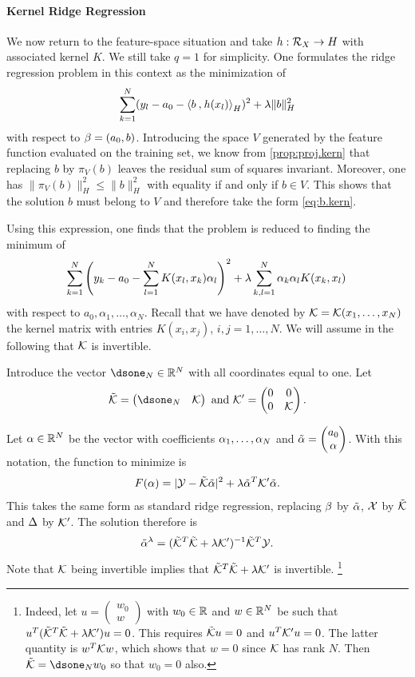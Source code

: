 \paragraph{Kernel Ridge Regression}
We now return to the feature-space situation and take $h: {\mathcal R}_X \to H$ with associated kernel $K$. We still take $q=1$ for simplicity. One formulates the ridge regression problem in this context as the minimization of
$$
\sum_{k=1}^N(y_l - {a_0} - {\langle {b}\mathbin{,} {h(x_l)}\rangle}_H)^2 + \lambda \|b\|_H^2
$$
with respect to $\beta = ({a_0}, b)$. Introducing the space $V$ generated by the feature function evaluated on the training set, we know from \cref{prop:proj.kern} that replacing $b$ by $\pi_V(b)$ leaves the residual sum of squares invariant. Moreover, one has $\|\pi_V(b)\|_H^2 \leq \|b\|_H^2$ with equality if and only if $b\in V$. This shows that the solution $b$ must belong to $V$ and therefore take the form \eqref{eq:b.kern}. 

Using this expression, one finds that the problem is  reduced to finding the minimum of 
$$
\sum_{k=1}^N\left(y_k - {a_0} - \sum_{l=1}^N K(x_l, x_k)\alpha_l \right)^2 +
\lambda \sum_{k,l=1}^N \alpha_k\alpha_l K(x_k, x_l)\,
$$
with respect to ${a_0}, \alpha_1, \ldots, \alpha_N$. 
Recall that we have denoted by ${\mathcal K} = {\mathcal K}(x_1, \ldots, x_N)$ the kernel matrix with entries $K(x_i,x_j)$, $i,j=1, \ldots, N$. We will assume in the following that ${\mathcal K}$ is invertible. 

Introduce the vector $\dsone_N\in \mR^N$  with all coordinates equal to one.  Let 
\[
\tilde \CK = \begin{pmatrix} \dsone_{N} &\CK\end{pmatrix} \text{ and } \CK' = \begin{pmatrix} 0 & 0 \\0 &\CK\end{pmatrix}.
\]

Let $\alpha\in {\mathbb{R}}^N$ be the vector with coefficients $\alpha_1, \ldots, \alpha_N$ and $\tilde {\alpha}  = \begin{pmatrix}{a_0}\\ \alpha \end{pmatrix}$. 
With this notation, the function to minimize is
\[
F(\alpha) = |{\mathcal Y} - \tilde{{\mathcal K}} \tilde{\alpha}|^2 + \lambda \tilde {\alpha}^T {\mathcal K}' \tilde {\alpha}.
\]
This takes the same form as standard ridge regression, replacing $\beta$ by $\tilde {\alpha}$, ${\mathcal X}$ by $\tilde {{\mathcal K}}$ and $\Delta$ by ${\mathcal K}'$. The solution therefore is
\[
\tilde {\alpha}^\lambda = (\tilde {{\mathcal K}}^T\tilde {{\mathcal K}} + \lambda {\mathcal K}')^{-1} \tilde{{\mathcal K}}^T {\mathcal Y} .
\]
Note that ${\mathcal K}$ being invertible implies that $\tilde {{\mathcal K}}^T\tilde {{\mathcal K}} + \lambda {\mathcal K}'$ is invertible.
\footnote{Indeed, let $u = \begin{pmatrix}
w_0\\w
\end{pmatrix}
$ with $w_0\in {\mathbb{R}}$ and $w\in {\mathbb{R}}^N$ be such that $u^T(\tilde {{\mathcal K}}^T\tilde {{\mathcal K}} + \lambda {\mathcal K}')u = 0$.
This requires $\tilde {{\mathcal K}} u = 0$ and $u^T{\mathcal K}'u = 0$.
The latter quantity is $w^T{\mathcal K} w$, which shows that $w=0$ since ${\mathcal K}$ has rank $N$.
Then $\tilde \CK = \dsone_{N} w_0$ so that $w_0=0$ also. }

